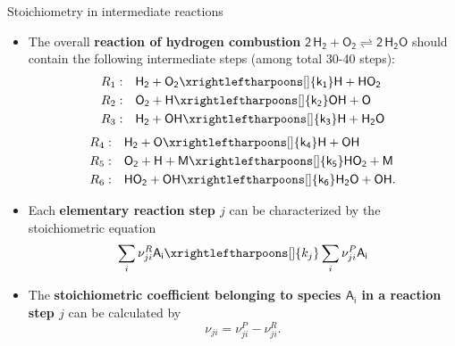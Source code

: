 \begin{frame}{Stoichiometry in intermediate reactions}
	\small
	\begin{itemize}
		\item 
	The overall \alert{\bf reaction of hydrogen combustion} $\mathsf{2 \, H_2 + O_2 \rightleftharpoons 2\, H_2O}$ should contain the following intermediate steps (among total 30-40 steps):
	{\small
		\lcol
		\begin{alignat*}{2}
			R_1:  & \quad \mathsf{H_2 + O_2 \xrightleftharpoons[]{k_1} H + HO_2} \\
			R_2: & \quad \mathsf{O_2 + H \xrightleftharpoons[]{k_2} OH + O} \\
			R_3: & \quad \mathsf{H_2 + OH \xrightleftharpoons[]{k_3} H + H_2O} \\
		\end{alignat*}
	  \rcol
	  \vskip -30pt
	  \begin{alignat*}{2}
	  	R_4: & \quad \mathsf{H_2 + O \xrightleftharpoons[]{k_4} H + OH} \\
	  	R_5: & \quad \mathsf{O_2 + H + M \xrightleftharpoons[]{k_5} HO_2 + M} \\
	  	R_6: & \quad \mathsf{HO_2 + OH \xrightleftharpoons[]{k_6} H_2O + OH}.
	  \end{alignat*}
	  \ecol
	}
	\pause
	\item Each {\bf elementary reaction step $j$} can be characterized by the stoichiometric equation
	\[
	\sum_{i} \nu^R_{ji}	\mathsf{A_i} \xrightleftharpoons[]{k_j} \sum_{i} \nu^P_{ji} \mathsf{A_i}
	\]
	\vskip -10pt
	\pause
	\item The \alert{\bf stoichiometric coefficient belonging to species $\mathsf{A_i}$ in a reaction step $j$} can be calculated by
	\[
	\nu_{ji} = \nu^P_{ji} - \nu^R_{ji}.
	\]
\end{itemize}
\end{frame}
%
%
